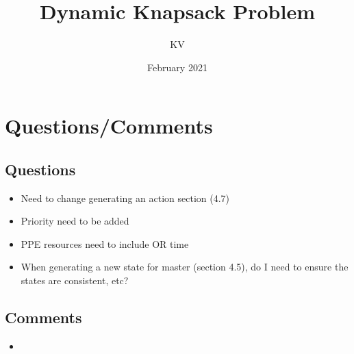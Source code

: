 \documentclass{article}
\title{Dynamic Knapsack Problem}
\author{KV}
\date{February 2021}
\begin{document}
\maketitle
\tableofcontents

\section{Questions/Comments}

\subsection{Questions}
\begin{itemize}
	\item Need to change generating an action section (4.7)
	\item Priority need to be added
	\item PPE resources need to include OR time
	\item When generating a new state for master (section 4.5), do I need to ensure the states are consistent, etc?
\end{itemize}

\subsection{Comments}
\begin{itemize}
	\item
\end{itemize}
\end{document}
